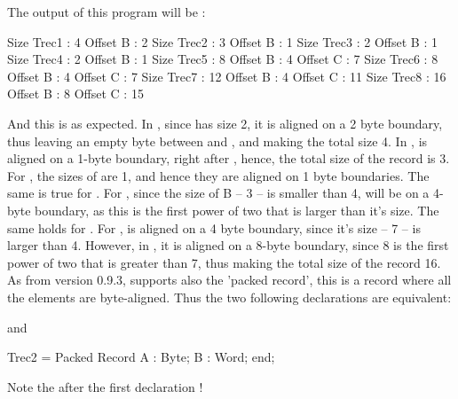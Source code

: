 \documentclass{report}
\begin{document}
The output of this program will be :
\begin{listing}
Size Trec1 : 4 Offset B : 2
Size Trec2 : 3 Offset B : 1
Size Trec3 : 2 Offset B : 1
Size Trec4 : 2 Offset B : 1
Size Trec5 : 8 Offset B : 4 Offset C : 7
Size Trec6 : 8 Offset B : 4 Offset C : 7
Size Trec7 : 12 Offset B : 4 Offset C : 11
Size Trec8 : 16 Offset B : 8 Offset C : 15
\end{listing}
And this is as expected. In , since  has size 2, it is 
aligned on a 2 byte boundary, thus leaving an empty byte between  
and , and making the total size 4. In ,  is aligned 
on a 1-byte boundary, right after , hence, the total size of the 
record is 3.
For , the sizes of  are 1, and hence they are aligned on 1
byte boundaries. The same is true for .
For , since the size of B -- 3 -- is smaller than 4,  will 
be on a  4-byte boundary, as this is the first power of two that is 
larger than it's size. The same holds for .
For ,  is aligned on a 4 byte boundary, since it's size --
7 -- is larger than 4. However, in , it is aligned on a 8-byte
boundary, since 8 is the first power of two that is greater than 7, thus
making the total size of the record 16.
As from version 0.9.3, \fpc supports also the 'packed record', this is a 
record where all the elements are byte-aligned.
Thus the two following declarations are equivalent:
and
\begin{listing}
     Trec2 = Packed Record
       A : Byte;
       B : Word;
       end;
\end{listing}
Note the  after the first declaration !
\end{document}
